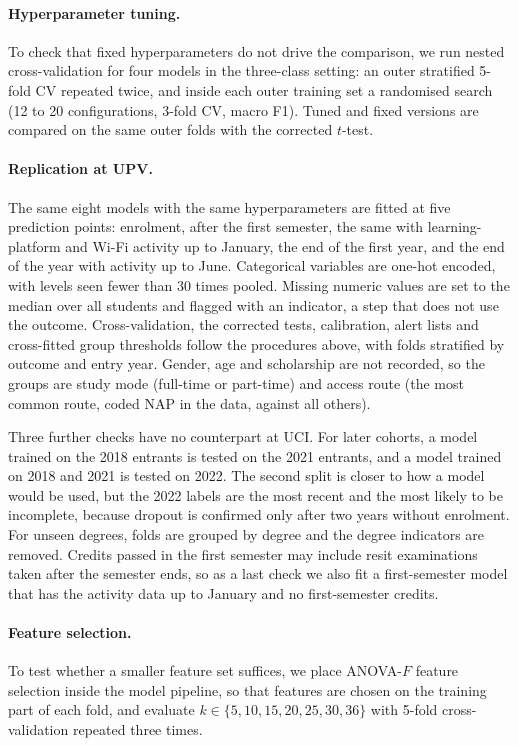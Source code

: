 \documentclass[11pt,a4paper]{article}
\begin{document}
\paragraph{Hyperparameter tuning.} To check that fixed hyperparameters do not drive the comparison, we run nested cross-validation for four models in the three-class setting: an outer stratified 5-fold CV repeated twice, and inside each outer training set a randomised search (12 to 20 configurations, 3-fold CV, macro F1). Tuned and fixed versions are compared on the same outer folds with the corrected $t$-test.

\paragraph{Replication at UPV.} The same eight models with the same hyperparameters are fitted at five prediction points: enrolment, after the first semester, the same with learning-platform and Wi-Fi activity up to January, the end of the first year, and the end of the year with activity up to June. Categorical variables are one-hot encoded, with levels seen fewer than 30 times pooled. Missing numeric values are set to the median over all students and flagged with an indicator, a step that does not use the outcome. Cross-validation, the corrected tests, calibration, alert lists and cross-fitted group thresholds follow the procedures above, with folds stratified by outcome and entry year. Gender, age and scholarship are not recorded, so the groups are study mode (full-time or part-time) and access route (the most common route, coded NAP in the data, against all others).

Three further checks have no counterpart at UCI. For later cohorts, a model trained on the 2018 entrants is tested on the 2021 entrants, and a model trained on 2018 and 2021 is tested on 2022. The second split is closer to how a model would be used, but the 2022 labels are the most recent and the most likely to be incomplete, because dropout is confirmed only after two years without enrolment. For unseen degrees, folds are grouped by degree and the degree indicators are removed. Credits passed in the first semester may include resit examinations taken after the semester ends, so as a last check we also fit a first-semester model that has the activity data up to January and no first-semester credits.

\paragraph{Feature selection.} To test whether a smaller feature set suffices, we place ANOVA-$F$ feature selection inside the model pipeline, so that features are chosen on the training part of each fold, and evaluate $k\in\{5,10,15,20,25,30,36\}$ with 5-fold cross-validation repeated three times.
\end{document}
